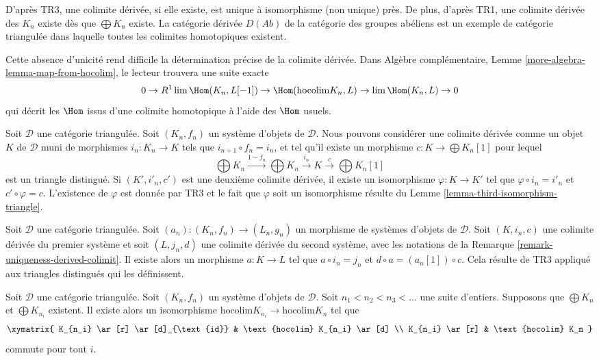 \noindent
D'après TR3, une colimite dérivée, si elle existe, est unique à isomorphisme
(non unique) près. De plus, d'après TR1, une colimite dérivée des $K_n$ existe
dès que $\bigoplus K_n$ existe. La catégorie dérivée $D(\textit{Ab})$ de la
catégorie des groupes abéliens est un exemple de catégorie triangulée dans
laquelle toutes les colimites homotopiques existent.

\medskip\noindent
Cette absence d'unicité rend difficile la détermination précise de la
colimite dérivée. Dans Algèbre complémentaire, Lemme
\ref{more-algebra-lemma-map-from-hocolim}, le lecteur trouvera une suite exacte
$$
0 \to R^1\lim \Hom(K_n, L[-1]) \to \Hom(\text{hocolim} K_n, L)
\to \lim \Hom(K_n, L) \to 0
$$
qui décrit les $\Hom$ issus d'une colimite homotopique à l'aide des $\Hom$
usuels.

\begin{remark}
\label{remark-uniqueness-derived-colimit}
Soit $\mathcal{D}$ une catégorie triangulée.
Soit $(K_n, f_n)$ un système d'objets de $\mathcal{D}$.
Nous pouvons considérer une colimite dérivée comme un objet $K$ de
$\mathcal{D}$ muni de morphismes $i_n : K_n \to K$ tels que
$i_{n + 1} \circ f_n = i_n$, et tel qu'il existe un morphisme
$c : K \to \bigoplus K_n[1]$ pour lequel
$$
\bigoplus K_n \xrightarrow{1 - f_n} \bigoplus K_n \xrightarrow{i_n}
K \xrightarrow{c} \bigoplus K_n[1]
$$
est un triangle distingué. Si $(K', i'_n, c')$ est une deuxième colimite
dérivée, il existe un isomorphisme $\varphi : K \to K'$ tel que
$\varphi \circ i_n = i'_n$ et $c' \circ \varphi = c$.
L'existence de $\varphi$ est donnée par TR3 et le fait que $\varphi$ soit un
isomorphisme résulte du Lemme \ref{lemma-third-isomorphism-triangle}.
\end{remark}

\begin{remark}
\label{remark-functoriality-derived-colimit}
Soit $\mathcal{D}$ une catégorie triangulée.
Soit $(a_n) : (K_n, f_n) \to (L_n, g_n)$ un morphisme de systèmes d'objets de
$\mathcal{D}$. Soit $(K, i_n, c)$ une colimite dérivée du premier système et
soit $(L, j_n, d)$ une colimite dérivée du second système, avec les notations
de la Remarque \ref{remark-uniqueness-derived-colimit}.
Il existe alors un morphisme $a : K \to L$ tel que
$a \circ i_n = j_n$ et
$d \circ a = (a_n[1]) \circ c$.
Cela résulte de TR3 appliqué aux triangles distingués qui les définissent.
\end{remark}

\begin{lemma}
\label{lemma-hocolim-subsequence}
Soit $\mathcal{D}$ une catégorie triangulée.
Soit $(K_n, f_n)$ un système d'objets de $\mathcal{D}$.
Soit $n_1 < n_2 < n_3 < \ldots$ une suite d'entiers.
Supposons que $\bigoplus K_n$ et $\bigoplus K_{n_i}$ existent.
Il existe alors un isomorphisme
$\text{hocolim} K_{n_i} \to \text{hocolim} K_n$ tel que
$$
\xymatrix{
K_{n_i} \ar[r] \ar[d]_{\text{id}} & \text{hocolim} K_{n_i} \ar[d] \\
K_{n_i} \ar[r] & \text{hocolim} K_n
}
$$
commute pour tout $i$.
\end{lemma}

